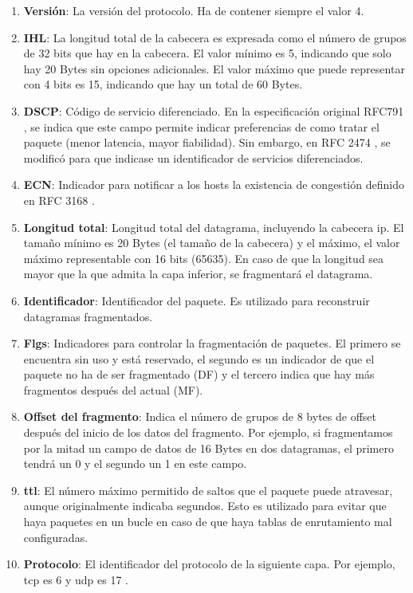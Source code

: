 \begin{enumerate}
    \item \textbf{Versión}: La versión del protocolo. Ha de contener siempre el valor 4.
    \item \textbf{IHL}: La longitud total de la cabecera es expresada como el número de grupos de 32 bits que hay en la cabecera. El valor mínimo es 5, indicando que solo hay 20 Bytes sin opciones adicionales. El valor máximo que puede representar con 4 bits es 15, indicando que hay un total de 60 Bytes.
    \item \textbf{DSCP}: Código de servicio diferenciado. En la especificación original RFC791 \cite{rfc791}, se indica que este campo permite indicar preferencias de como tratar el paquete (menor latencia, mayor fiabilidad). Sin embargo, en RFC 2474 \cite{rfc2474}, se modificó para que indicase un identificador de servicios diferenciados.
    \item \textbf{ECN}: Indicador para notificar a los hosts la existencia de congestión definido en RFC 3168 \cite{rfc3168}.
    \item \textbf{Longitud total}: Longitud total del datagrama, incluyendo la cabecera \acrshort{ip}. El tamaño mínimo es 20 Bytes (el tamaño de la cabecera) y el máximo, el valor máximo representable con 16 bits (65635). En caso de que la longitud sea mayor que la que admita la capa inferior, se fragmentará el datagrama.
    \item \textbf{Identificador}: Identificador del paquete. Es utilizado para reconstruir datagramas fragmentados.
    \item \textbf{Flgs}: Indicadores para controlar la fragmentación de paquetes. El primero se encuentra sin uso y está reservado, el segundo es un indicador de que el paquete no ha de ser fragmentado (DF) y el tercero indica que hay más fragmentos después del actual (MF).
    \item \textbf{Offset del fragmento}: Indica el número de grupos de 8 bytes de offset después del inicio de los datos del fragmento. Por ejemplo, si fragmentamos por la mitad un campo de datos de 16 Bytes en dos datagramas, el primero tendrá un 0 y el segundo un 1 en este campo.
    \item \textbf{\acrshort{ttl}}: El número máximo permitido de saltos que el paquete puede atravesar, aunque originalmente indicaba segundos. Esto es utilizado para evitar que haya paquetes en un bucle en caso de que haya tablas de enrutamiento mal configuradas.
    \item \textbf{Protocolo}: El identificador del protocolo de la siguiente capa. Por ejemplo, \acrshort{tcp} es 6 y \acrshort{udp} es 17 \cite{ipprotocolnumbers}.

\end{enumerate}
